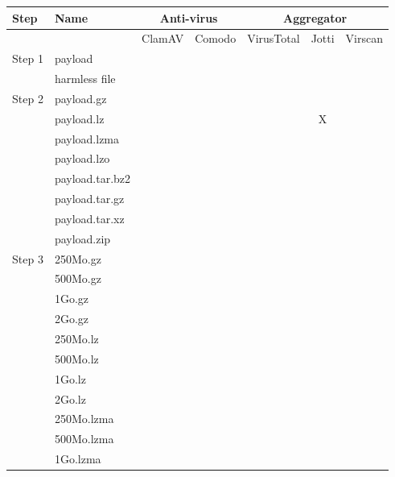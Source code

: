 \documentclass{article}           %
\title{}     %
\author{}        %
\begin{document}

\begin{table}[ht!]
\begin{normalsize}
\begin{center}
\begin{tabular}{|l|l|c|c|c|c|c|}
    \hline
     \textbf{Step} & \textbf{Name}  & \multicolumn{2}{|c|}{\textbf{Anti-virus}} & \multicolumn{3}{|c|}{\textbf{Aggregator}} \\
    \hline
     & & ClamAV & Comodo & VirusTotal & Jotti & Virscan \\
      \hline \hline
    Step 1 & payload &  &  &  &  &  \\ \cline{2-7}
    
    & harmless file &  &  &  &  &  \\
    \hline \hline
    Step 2 & payload.gz &  &  &  &  &  \\
    \cline{2-7}
    & payload.lz &  &  &  & \textsf{X} & \\
    \cline{2-7}
    & payload.lzma &  &  &  &  & \\
    \cline{2-7}
    & payload.lzo &  &  &  &  &  \\
    \cline{2-7}
    & payload.tar.bz2 &  &  &  &  &  \\
    \cline{2-7}
    & payload.tar.gz &  &  &  &  & \\
    \cline{2-7}
    & payload.tar.xz &  &  &  &  &  \\
    \cline{2-7}
    & payload.zip &  &  &  &  & \\
    \hline \hline
    Step 3 	& 250Mo.gz &  &  &  &  &  \\
    \cline{2-7}
    			& 500Mo.gz &  &  &  &  &  \\
    	\cline{2-7}
    			& 1Go.gz &  &  &  &  &  \\
    	\cline{2-7}
    			& 2Go.gz &  &  &  &  &  \\
    	\cline{2-7}
    			& 250Mo.lz &  &  &  &  &  \\
    \cline{2-7}
    			& 500Mo.lz &  &  &  &  &  \\
    	\cline{2-7}
    			& 1Go.lz &  &  &  &  &  \\
    	\cline{2-7}
    			& 2Go.lz &  &  &  &  &  \\
    	\cline{2-7}
    			& 250Mo.lzma &  &  &  &  &  \\
    \cline{2-7}
    			& 500Mo.lzma &  &  &  &  &  \\
    	\cline{2-7}
    			& 1Go.lzma &  &  &  &  &  \\

\end{tabular}
\end{center}
\end{normalsize}
\end{table}
\end{document}
